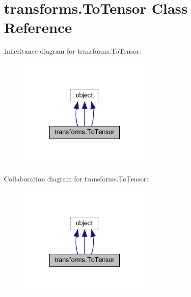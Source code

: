 \hypertarget{classtransforms_1_1ToTensor}{}\section{transforms.\+To\+Tensor Class Reference}
\label{classtransforms_1_1ToTensor}


Inheritance diagram for transforms.\+To\+Tensor\+:
\nopagebreak
\begin{figure}[H]
\begin{center}
\leavevmode
\includegraphics[width=187pt]{classtransforms_1_1ToTensor__inherit__graph}
\end{center}
\end{figure}


Collaboration diagram for transforms.\+To\+Tensor\+:
\nopagebreak
\begin{figure}[H]
\begin{center}
\leavevmode
\includegraphics[width=187pt]{classtransforms_1_1ToTensor__coll__graph}
\end{center}
\end{figure}
